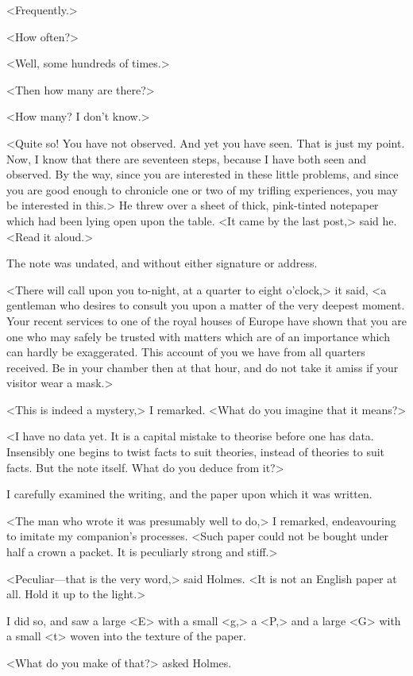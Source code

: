<Frequently.>

<How often?>

<Well, some hundreds of times.>

<Then how many are there?>

<How many? I don't know.>

<Quite so! You have not observed. And yet you have seen. That is just my point. Now, I know that there are seventeen steps, because I have both seen and observed. By the way, since you are interested in these little problems, and since you are good enough to chronicle one or two of my trifling experiences, you may be interested in this.> He threw over a sheet of thick, pink-tinted notepaper which had been lying open upon the table. <It came by the last post,> said he. <Read it aloud.>

The note was undated, and without either signature or address.

<There will call upon you to-night, at a quarter to eight o'clock,> it said, <a gentleman who desires to consult you upon a matter of the very deepest moment. Your recent services to one of the royal houses of Europe have shown that you are one who may safely be trusted with matters which are of an importance which can hardly be exaggerated. This account of you we have from all quarters received. Be in your chamber then at that hour, and do not take it amiss if your visitor wear a mask.>

<This is indeed a mystery,> I remarked. <What do you imagine that it means?>

<I have no data yet. It is a capital mistake to theorise before one has data. Insensibly one begins to twist facts to suit theories, instead of theories to suit facts. But the note itself. What do you deduce from it?>

I carefully examined the writing, and the paper upon which it was written.

<The man who wrote it was presumably well to do,> I remarked, endeavouring to imitate my companion's processes. <Such paper could not be bought under half a crown a packet. It is peculiarly strong and stiff.>

<Peculiar—that is the very word,> said Holmes. <It is not an English paper at all. Hold it up to the light.>

I did so, and saw a large <E> with a small <g,> a <P,> and a large <G> with a small <t> woven into the texture of the paper.

<What do you make of that?> asked Holmes.

